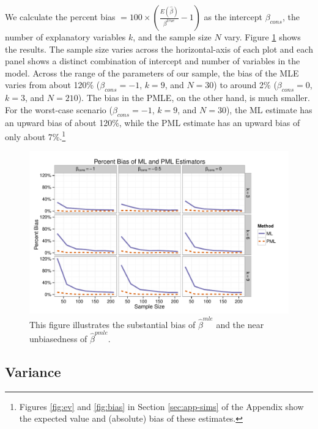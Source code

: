 \documentclass[12pt]{article}
\begin{document}
We calculate the percent bias $= 100 \times \left(\frac{E(\hat{\beta})}{\beta^{true}} - 1 \right)$ as the intercept $\beta_{cons}$, the number of explanatory variables $k$, and the sample size $N$ vary.
Figure \ref{fig:sims-coef-perc-bias} shows the results.
The sample size varies across the horizontal-axis of each plot and each panel shows a distinct combination of intercept and number of variables in the model.
Across the range of the parameters of our sample, the bias of the MLE varies from about 120\% ($\beta_{cons} = -1$, $k = 9$, and $N = 30$) to around 2\% ($\beta_{cons} = 0$, $k = 3$, and $N = 210$).
The bias in the PMLE, on the other hand, is much smaller.
For the worst-case scenario ($\beta_{cons} = -1$, $k = 9$, and $N = 30$), the ML estimate has an upward bias of about 120\%, while the PML estimate has an upward bias of only about 7\%.\footnote{Figures \ref{fig:ev} and \ref{fig:bias} in Section \ref{sec:app-sims} of the Appendix show the expected value and (absolute) bias of these estimates.}

\begin{figure}[h]
\begin{center}
\includegraphics[width = \textwidth]{figs/sims-percent-bias.pdf}
\caption{This figure illustrates the substantial bias of $\hat{\beta}^{mle}$ and the near unbiasedness of $\hat{\beta}^{pmle}$.}\label{fig:sims-coef-perc-bias}
\end{center}
\end{figure}

\subsection*{Variance}
\end{document}
